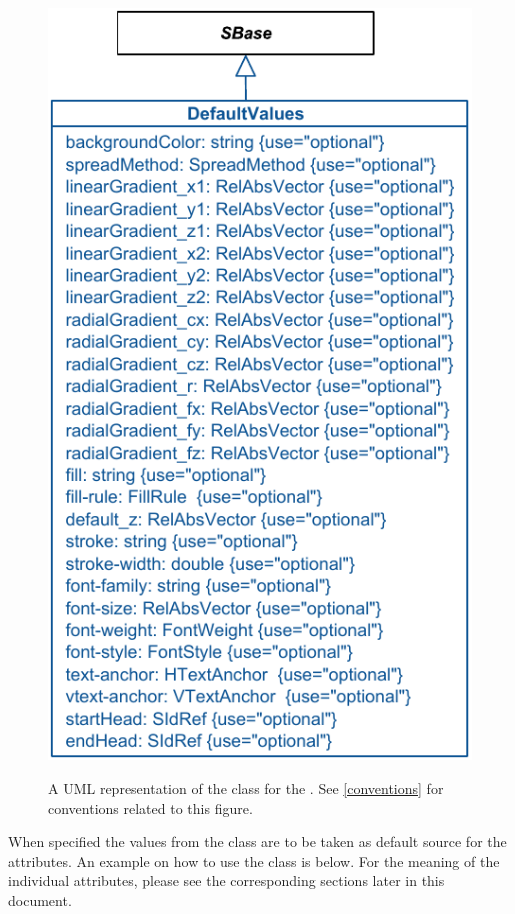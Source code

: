 \begin{figure}[h!]
  \centering
  \includegraphics{images/render-default-values}\\
  \caption{A UML representation of the \DefaultValues class for the \RenderPackage.  See \ref{conventions} for conventions related to this figure. }
  \label{fig:default-values}
\end{figure}

When specified the values from the \DefaultValues class are to be taken as 
default source for the attributes. An example on how to use the \DefaultValues 
class is below. For the meaning of the individual attributes, please see the 
corresponding sections later in this document. 


